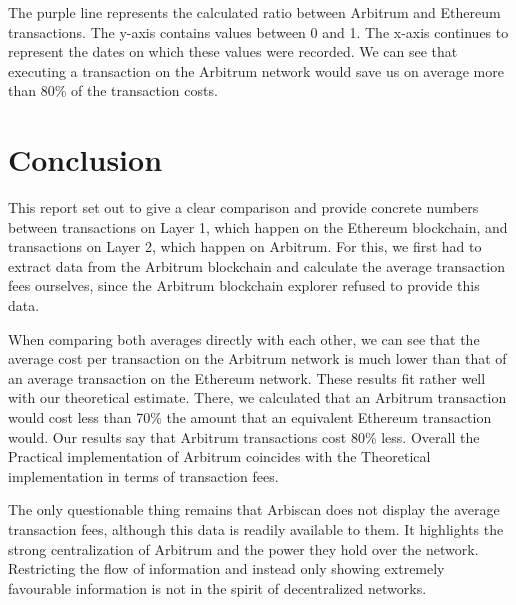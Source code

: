 \documentclass[a4paper,oneside,openright,11pt]{report}
\begin{document}
	The purple line represents the calculated ratio between Arbitrum and Ethereum transactions. The y-axis contains
	values between 0 and 1. The x-axis continues to represent the dates on which these values were recorded.
	We can see that executing a transaction on the Arbitrum network would save us on average more than 80\% of 
	the transaction costs.

\chapter{Conclusion}
\label{ch:conclusion}

This report set out to give a clear comparison and provide concrete numbers 
between transactions on Layer 1, which happen on the
Ethereum blockchain, and transactions on Layer 2, which happen on Arbitrum.
For this, we first had to extract data from the Arbitrum blockchain and calculate the 
average transaction fees ourselves, since the Arbitrum blockchain explorer refused to provide this data. 

When comparing both averages directly with each other, we can see that the average cost 
per transaction on the Arbitrum network is much lower than that of an average transaction on the
Ethereum network. These results fit rather well with our theoretical estimate. There, we calculated that
an Arbitrum transaction would cost less than 70\% the amount that an equivalent Ethereum transaction 
would. Our results say that Arbitrum transactions cost 80\% less. Overall the Practical implementation
of Arbitrum coincides with the Theoretical implementation in terms of transaction fees.

The only questionable thing remains that Arbiscan does not display the average transaction fees,
although this data is readily available to them. It highlights the strong centralization of Arbitrum 
and the power they hold over the network. Restricting the flow of information and instead only
showing extremely favourable information is not in the spirit of decentralized networks.





\end{document}
